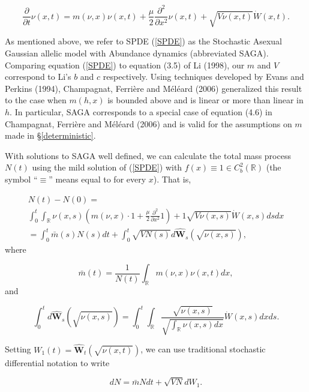 \documentclass[]{elsarticle} %
\begin{document}
\begin{equation}\label{SPDE}
\frac{\partial}{\partial t}\nu(x,t)=m(\nu,x)\nu(x,t)+\frac{\mu}{2}\frac{\partial^2}{\partial x^2}\nu(x,t)+\sqrt{V\nu(x,t)}\dot W(x,t).
\end{equation}

As mentioned above, we refer to SPDE (\ref{SPDE}) as the Stochastic
Asexual Gaussian allelic model with Abundance dynamics (abbreviated
SAGA). Comparing equation (\ref{SPDE}) to equation (3.5) of Li (1998),
our \(m\) and \(V\) correspond to Li's \(b\) and \(c\) respectively.
Using techniques developed by Evans and Perkins (1994), Champagnat,
Ferrière and Méléard (2006) generalized this result to the case when
\(m(h,x)\) is bounded above and is linear or more than linear in \(h\).
In particular, SAGA corresponds to a special case of equation (4.6) in
Champagnat, Ferrière and Méléard (2006) and is valid for the assumptions
on \(m\) made in \S\ref{deterministic}.

With solutions to SAGA well defined, we can calculate the total mass
process \(N(t)\) using the mild solution of (\ref{SPDE}) with
\(f(x)\equiv1\in C_b^2(\mathbb{R})\) (the symbol ``\(\equiv\)'' means
equal to for every \(x\)). That is,

\begin{multline}
N(t)-N(0)=\\
\int_0^t\int_\mathbb{R}\nu(x,s)\left(m(\nu,x)\cdot1+\frac{\mu}{2}\frac{\partial^2}{\partial x^2}1\right)+1\sqrt{V\nu(x,s)}\dot W(x,s)dsdx \\
=\int_0^t\bar m(s)N(s)dt+\int_0^t\sqrt{VN(s)}d\hat{\mathbf{W}}_s(\sqrt{\nu(x,s)}),
\end{multline} where

\begin{equation}
\bar m(t)=\frac{1}{N(t)}\int_\mathbb{R}m(\nu,x)\nu(x,t)dx,
\end{equation} and

\begin{equation}
\int_0^td\hat{\mathbf{W}}_s(\sqrt{\nu(x,s)})=\int_0^t\int_\mathbb{R}\frac{\sqrt{\nu(x,s)}}{\sqrt{\int_\mathbb{R}\nu(x,s)dx}}\dot W(x,s)dxds.
\end{equation}

Setting \(W_1(t)=\hat{\mathbf{W}}_t(\sqrt{\nu(x,t)})\), we can use
traditional stochastic differential notation to write

\begin{equation}
dN=\bar mNdt+\sqrt{VN}dW_1.
\end{equation}
\end{document}
